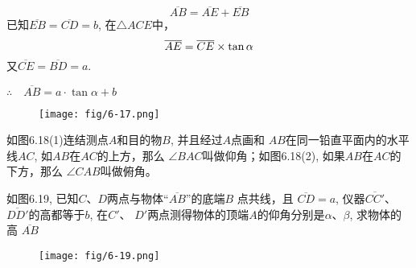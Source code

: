\begin{solution}
\[\overline{AB}=\overline{AE}+\overline{EB}\]
已知$\overline{EB}=\overline{CD}=b$, 在$\triangle ACE$中，
\[\overline{AE}=\overline{CE}\times\tan\alpha\]
又$\overline{CE}=\overline{BD}=a$.

$\therefore\quad \overline{AB}=a\cdot \tan\alpha+b$
\end{solution}

\begin{figure}[htp]\centering
    \begin{minipage}[t]{0.48\textwidth}
    \centering
\texttt{[image: fig/6-17.png]}
    \caption{}
    \end{minipage}
    \begin{minipage}[t]{0.48\textwidth}
    \centering
    \caption{}
    \end{minipage}
    \end{figure}

\begin{rmk}
    如图6.18(1)连结测点$A$和目的物$B$, 并且经过$A$点画和
$AB$在同一铅直平面内的水平线$AC$, 如$AB$在$AC$的上方，那么
$\angle BAC$叫做仰角；如图6.18(2), 如果$AB$在$AC$的下方，那么
$\angle CAB$叫做俯角。
\end{rmk}  


\begin{example}
    如图6.19, 已知$C$、$D$两点与物体“$\overline{AB}$”的底端$B$
点共线，且
$\overline{CD}=a$, 仪器$\overline{CC'}$、$\overline{DD'}$的高都等于$b$, 在$C'$、
$D'$两点测得物体的顶端$A$的仰角分别是$\alpha$、$\beta$, 求物体的高
$\overline{AB}$
\end{example}

\begin{figure}[htp]\centering
    \begin{minipage}[t]{0.48\textwidth}
    \centering
    \texttt{[image: fig/6-19.png]}
    \caption{}
    \end{minipage}
    \begin{minipage}[t]{0.48\textwidth}
    \centering
    \caption{}
    \end{minipage}
    \end{figure}


